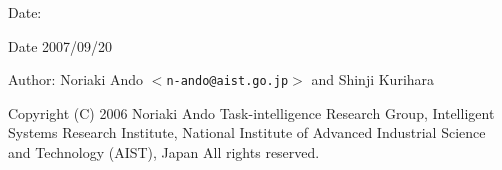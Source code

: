 \begin{Desc}
\item[Date:]\begin{Desc}
\item[Date]2007/09/20 \end{Desc}
\end{Desc}
\begin{Desc}
\item[Author:]Noriaki Ando $<${\tt n-ando@aist.go.jp}$>$ and Shinji Kurihara\end{Desc}
Copyright (C) 2006 Noriaki Ando Task-intelligence Research Group, Intelligent Systems Research Institute, National Institute of Advanced Industrial Science and Technology (AIST), Japan All rights reserved.